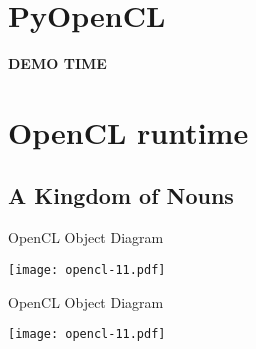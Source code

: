 \documentclass[english,compress]{beamer}
\def\bigncentered#1{
  \begin{center}
    \Huge\bfseries #1
  \end{center}
}
\begin{document}
\section{PyOpenCL}
\begin{frame}
  \bigncentered{DEMO TIME}
\end{frame}
\section[Runtime]{OpenCL runtime}
\subsection{A Kingdom of Nouns}
\begin{frame}{OpenCL Object Diagram}
  \begin{center}
  \texttt{[image: opencl-11.pdf]}
  \end{center}
\end{frame}












\begin{frame}{OpenCL Object Diagram}
  \begin{center}
  \texttt{[image: opencl-11.pdf]}
  \end{center}
\end{frame}
\end{document}
